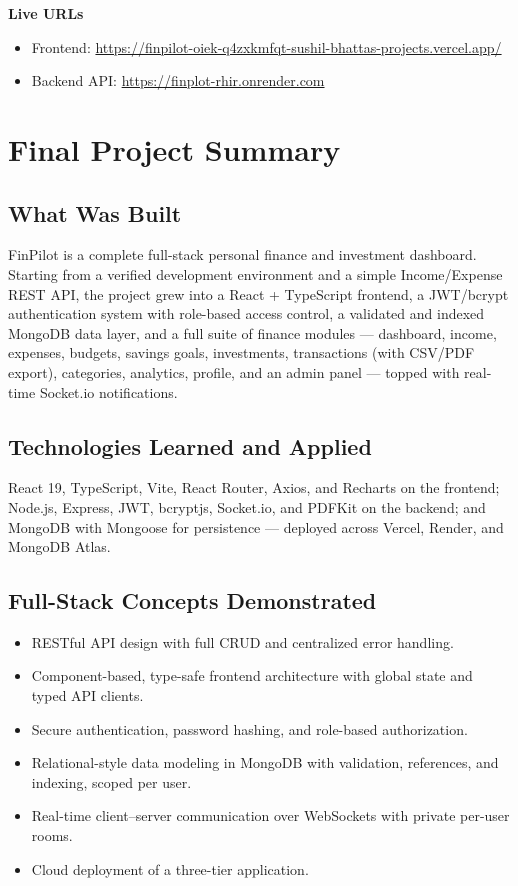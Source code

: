 \documentclass[11pt,a4paper]{report}
\begin{document}
\noindent\textbf{Live URLs}
\begin{itemize}[leftmargin=1.4em]
  \item Frontend: \url{https://finpilot-oiek-q4zxkmfqt-sushil-bhattas-projects.vercel.app/}
  \item Backend API: \url{https://finplot-rhir.onrender.com}
\end{itemize}

\chapter{Final Project Summary}

\section{What Was Built}
FinPilot is a complete full-stack personal finance and investment dashboard.
Starting from a verified development environment and a simple Income/Expense REST
API, the project grew into a React + TypeScript frontend, a JWT/bcrypt
authentication system with role-based access control, a validated and indexed
MongoDB data layer, and a full suite of finance modules --- dashboard, income,
expenses, budgets, savings goals, investments, transactions (with CSV/PDF
export), categories, analytics, profile, and an admin panel --- topped with
real-time Socket.io notifications.

\section{Technologies Learned and Applied}
React 19, TypeScript, Vite, React Router, Axios, and Recharts on the frontend;
Node.js, Express, JWT, bcryptjs, Socket.io, and PDFKit on the backend; and MongoDB
with Mongoose for persistence --- deployed across Vercel, Render, and MongoDB
Atlas.

\section{Full-Stack Concepts Demonstrated}
\begin{itemize}[leftmargin=1.4em]
  \item RESTful API design with full CRUD and centralized error handling.
  \item Component-based, type-safe frontend architecture with global state and
        typed API clients.
  \item Secure authentication, password hashing, and role-based authorization.
  \item Relational-style data modeling in MongoDB with validation, references,
        and indexing, scoped per user.
  \item Real-time client--server communication over WebSockets with private
        per-user rooms.
  \item Cloud deployment of a three-tier application.
\end{itemize}
\end{document}
